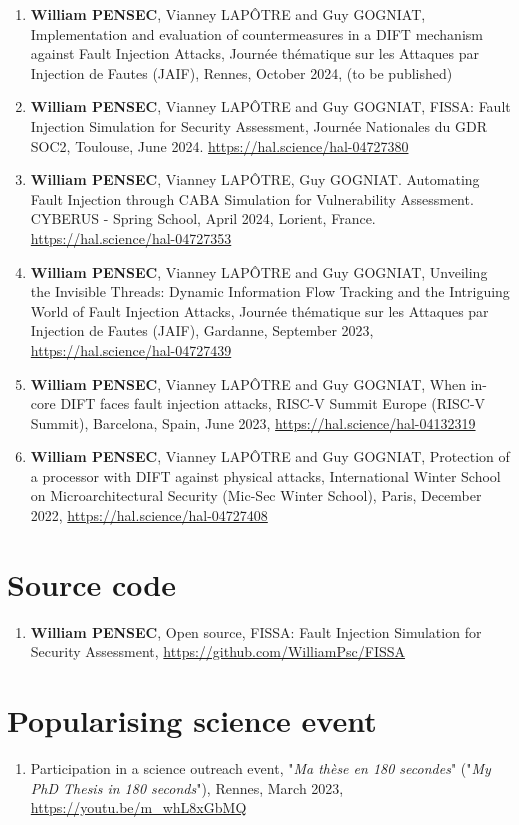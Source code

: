 \begin{enumerate}
    \item \textbf{William PENSEC}, Vianney LAPÔTRE and Guy GOGNIAT, Implementation and evaluation of countermeasures in a DIFT mechanism against Fault Injection Attacks, Journée thématique sur les Attaques par Injection de Fautes (JAIF), Rennes, October 2024, (to be published)
    \item \textbf{William PENSEC}, Vianney LAPÔTRE and Guy GOGNIAT, FISSA: Fault Injection Simulation for Security Assessment, Journée Nationales du GDR SOC2, Toulouse, June 2024. \url{https://hal.science/hal-04727380}
    \item \textbf{William PENSEC}, Vianney LAPÔTRE, Guy GOGNIAT. Automating Fault Injection through CABA Simulation for Vulnerability Assessment. CYBERUS - Spring School, April 2024, Lorient, France. \url{https://hal.science/hal-04727353}
    \item \textbf{William PENSEC}, Vianney LAPÔTRE and Guy GOGNIAT, Unveiling the Invisible Threads: Dynamic Information Flow Tracking and the Intriguing World of Fault Injection Attacks, Journée thématique sur les Attaques par Injection de Fautes (JAIF), Gardanne, September 2023, \url{https://hal.science/hal-04727439}
    \item \textbf{William PENSEC}, Vianney LAPÔTRE and Guy GOGNIAT, When in-core DIFT faces fault injection attacks, RISC-V Summit Europe (RISC-V Summit), Barcelona, Spain, June 2023, \url{https://hal.science/hal-04132319}
    \item \textbf{William PENSEC}, Vianney LAPÔTRE and Guy GOGNIAT, Protection of a processor with DIFT against physical attacks, International Winter School on Microarchitectural Security (Mic-Sec Winter School), Paris, December 2022, \url{https://hal.science/hal-04727408}
\end{enumerate}
\section{Source code}

\begin{enumerate}
    \item \textbf{William PENSEC}, Open source, FISSA: Fault Injection Simulation for Security Assessment, \url{https://github.com/WilliamPsc/FISSA}
\end{enumerate}
\section{Popularising science event}

\begin{enumerate}
    \item Participation in a science outreach event, "\textit{Ma thèse en 180 secondes}" ({\footnotesize "\textit{My PhD Thesis in 180 seconds}"}), Rennes, March 2023, \url{https://youtu.be/m_whL8xGbMQ}
\end{enumerate}
